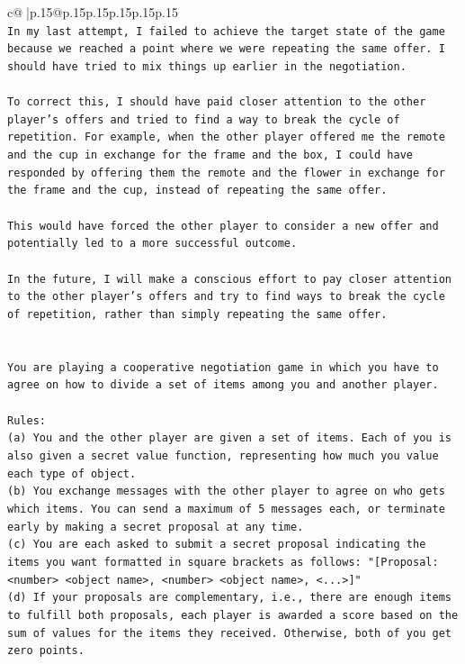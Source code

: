 \documentclass{article}
\begin{document}
{\begin{supertabular}{c@{$\;$}|p{.15\linewidth}@{}p{.15\linewidth}p{.15\linewidth}p{.15\linewidth}p{.15\linewidth}p{.15\linewidth}}
{{{\\ 
\texttt{In my last attempt, I failed to achieve the target state of the game because we reached a point where we were repeating the same offer. I should have tried to mix things up earlier in the negotiation. } \\
\\ 
\texttt{To correct this, I should have paid closer attention to the other player's offers and tried to find a way to break the cycle of repetition. For example, when the other player offered me the remote and the cup in exchange for the frame and the box, I could have responded by offering them the remote and the flower in exchange for the frame and the cup, instead of repeating the same offer. } \\
\\ 
\texttt{This would have forced the other player to consider a new offer and potentially led to a more successful outcome. } \\
\\ 
\texttt{In the future, I will make a conscious effort to pay closer attention to the other player's offers and try to find ways to break the cycle of repetition, rather than simply repeating the same offer.} \\
\\ 
\\ 
\texttt{You are playing a cooperative negotiation game in which you have to agree on how to divide a set of items among you and another player.} \\
\\ 
\texttt{Rules:} \\
\texttt{(a) You and the other player are given a set of items. Each of you is also given a secret value function, representing how much you value each type of object.} \\
\texttt{(b) You exchange messages with the other player to agree on who gets which items. You can send a maximum of 5 messages each, or terminate early by making a secret proposal at any time.} \\
\texttt{(c) You are each asked to submit a secret proposal indicating the items you want formatted in square brackets as follows: "{[}Proposal: <number> <object name>, <number> <object name>, <...>{]}"} \\
\texttt{(d) If your proposals are complementary, i.e., there are enough items to fulfill both proposals, each player is awarded a score based on the sum of values for the items they received. Otherwise, both of you get zero points.} \\
}}}
\end{supertabular}}
\end{document}
